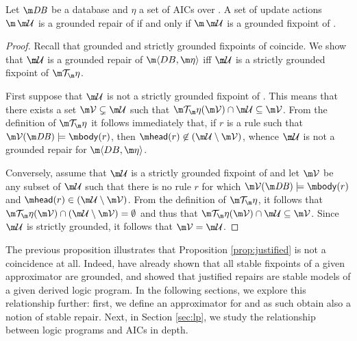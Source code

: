 \begin{proposition}\label{prop:grounded:ok}
 Let $\db$ be a database and $\eta$ a set of AICs over \db. A set of update actions $\spaceUU$ is a grounded repair of \fulldb if and only if $\spaceUU$ is a grounded fixpoint of \Op. 
\end{proposition}
\begin{proof}
Recall that grounded and strictly grounded fixpoints of \Op coincide.
We show that $\UU$ is a grounded repair of $\fulldb$ iff $\UU$ is a strictly grounded fixpoint of $\Op$.

First suppose
that $\UU$ is not a strictly grounded fixpoint of \Op.
This means that there exists a set $\VV\subsetneq\UU$ such that $\Op(\VV)\cap\UU\subseteq\VV$.
From the definition of $\Op$ it follows immediately that, if $r$ is a rule such that $\VV(\db)\models\body(r)$, then $\head(r)\not\in(\UU\setminus\VV)$, whence $\UU$ is not a grounded repair for $\fulldb$.
 
Conversely, assume that $\UU$ is a strictly grounded fixpoint of \Op
and let $\VV$ be any subset of $\UU$ such that there is no rule $r$ for which $\VV(\db)\models\body(r)$ and $\head(r)\in(\UU\setminus\VV)$. From the definition of $\Op$, it follows that $\Op(\VV)\cap(\UU\setminus\VV)=\emptyset$ and thus that $\Op(\VV)\cap\UU\subseteq \VV$. Since $\UU$ is strictly grounded, it follows that $\VV=\UU$. 
\end{proof}

The previous proposition illustrates that Proposition \ref{prop:justified} is not a coincidence at all. 
Indeed,  have already shown that all stable fixpoints of a given approximator are grounded, and 
\citet[Theorem~6]{tplp/CaropreseT11} showed that justified repairs are stable models of a given derived logic program. 
In the following sections, we explore this relationship further: first, we define an approximator for \Op and as such obtain also a notion of stable repair. 
Next, in Section \ref{sec:lp}, we  study the relationship between logic programs and AICs in depth. 

